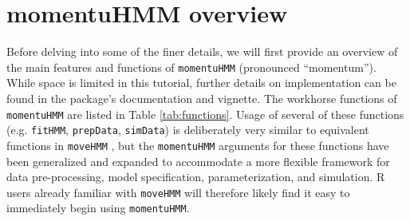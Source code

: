 \documentclass[12pt]{article}\usepackage[]{graphicx}\usepackage[]{color}
\begin{document}
\section{momentuHMM overview}
Before delving into some of the finer details, we will first provide an overview of the main features and functions of \verb|momentuHMM| (pronounced ``momentum''). While space is limited in this tutorial, further details on implementation can be found in the package's documentation and vignette. The workhorse functions of \verb|momentuHMM| are listed in Table \ref{tab:functions}. Usage of several of these functions (e.g. \verb|fitHMM|, \verb|prepData|, \verb|simData|) is deliberately very similar to equivalent functions in \verb|moveHMM| \citep{MichelotEtAl2016} , but the \verb|momentuHMM| arguments for these functions have been generalized and expanded to accommodate a more flexible framework for data pre-processing, model specification, parameterization, and simulation. R users already familiar with \verb|moveHMM| will therefore likely find it easy to immediately begin using \verb|momentuHMM|. %
\end{document}
